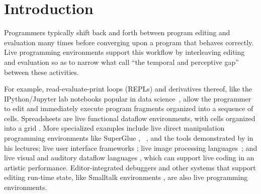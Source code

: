 \vspace{-5px}
\newcommand{\introSec}{Introduction}
\section{\protect\introSec} %
\label{sec:intro}
\vspace{-2px}


Programmers typically shift back and forth between program editing and evaluation many times before converging upon a program that behaves correctly. 
Live programming environments support this workflow by interleaving editing and evaluation so as to   
narrow what \citet{burckhardt2013s} call ``the temporal and perceptive gap'' between these activities.

For example, read-evaluate-print loops (REPLs) and derivatives thereof, like the IPython/Jupyter lab notebooks popular in data science~\cite{PER-GRA:2007}, allow the programmer to edit and immediately execute program fragments organized into a sequence of cells. 
Spreadsheets are live functional dataflow environments, with cells organized into a grid \cite{DBLP:journals/jfp/Wakeling07}. 
More specialized examples include live direct manipulation programming environments like SuperGlue
\cite{McDirmid:2007}, \sns{}~\cite{sns-pldi,sns-uist}, and the tools
demonstrated by \citet{victor2012inventing} in his lectures;
%
live user interface frameworks \cite{burckhardt2013s};
%
live image processing languages~\cite{DBLP:journals/vlc/Tanimoto90};
%
and live visual and auditory dataflow languages \cite{DBLP:conf/vl/BurnettAW98}, which can support live coding in an artistic performance.
Editor-integrated debuggers \cite{mccauley2008debugging} and other systems that support editing run-time state, like Smalltalk environments \cite{Goldberg:1983cn}, are also live programming environments. 

